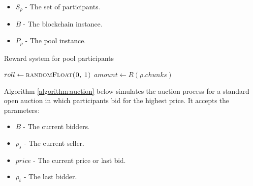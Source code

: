 \begin{itemize}
    \item $S_\rho$ - The set of participants.
    \item $B$ - The blockchain instance.
    \item $P_\rho$ - The pool instance.
\end{itemize}

\begin{algorithm}[H]
\caption{Reward system for pool participants}
\label{algorithm:reward}
\begin{algorithmic}[1]
    \State $roll \gets \textsc{randomFloat(0, 1)}$ 
        \State \Return {} 
    \EndIf
        \State $amount \gets R(\rho.chunks)$ 
    \EndFor
\EndProcedure
\end{algorithmic}
\end{algorithm}

Algorithm \ref{algorithm:auction} below simulates the auction process for a standard open auction in which participants bid for the highest price. It accepts the parameters:

\begin{itemize}
    \item $B$ - The current bidders.
    \item $\rho_s$ - The current seller.
    \item $price$ - The current price or last bid.
    \item $\rho_b$ - The last bidder.
\end{itemize}

